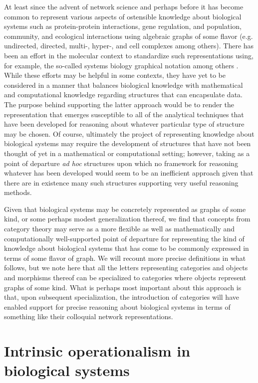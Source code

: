 \documentclass[aps,twocolumn]{revtex4-1}
\begin{document}
At least since the advent of network science and perhaps before it has become common to represent various aspects of ostensible knowledge about biological systems such as protein-protein interactions, gene regulation, and population, community, and ecological interactions using algebraic graphs of some flavor (e.g. undirected, directed, multi-, hyper-, and cell complexes among others). There has been an effort in the molecular context to standardize such representations using, for example, the so-called systems biology graphical notation among others \cite{Ghosh2011}. While these efforts may be helpful in some contexts, they have yet to be considered in a manner that balances biological knowledge with mathematical and computational knowledge regarding structures that can encapsulate data. The purpose behind supporting the latter approach would be to render the representation that emerges susceptible to all of the analytical techniques that have been developed for reasoning about whatever particular type of structure may be chosen. Of course, ultimately the project of representing knowledge about biological systems may require the development of structures that have not been thought of yet in a mathematical or computational setting; however, taking as a point of departure \emph{ad hoc} structures upon which no framework for reasoning whatever has been developed would seem to be an inefficient approach given that there are in existence many such structures supporting very useful reasoning methods.

Given that biological systems may be concretely represented as graphs of some kind, or some perhaps modest generalization thereof, we find that concepts from category theory may serve as a more flexible as well as mathematically and computationally well-supported point of departure for representing the kind of knowledge about biological systems that has come to be commonly expressed in terms of some flavor of graph. We will recount more precise definitions in what follows, but we note here that all the letters representing categories and objects and morphisms thereof can be specialized to categories where objects represent graphs of some kind. What is perhaps most important about this approach is that, upon subsequent specialization, the introduction of categories will have enabled support for precise reasoning about biological systems in terms of something like their colloquial network representations.

\section{Intrinsic operationalism in biological systems}
\end{document}
